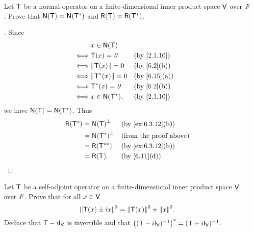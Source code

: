 \begin{ex}\label{ex:6.4.9}
	Let \(\mathsf{T}\) be a normal operator on a finite-dimensional inner product space \(\mathsf{V}\) over \(\mathit{F}\).
	Prove that \(\ns{\T} = \ns{\T^*}\) and \(\rg{\T} = \rg{\T^*}\).
\end{ex}

\begin{proof}[]
	Since
	\begin{align*}
		     & x \in \ns{\T}                        \\
		\iff & \T(x) = \zv        &  & \by{2.1.10}  \\
		\iff & \norm{\T(x)} = 0   &  & \by{6.2}[b]  \\
		\iff & \norm{\T^*(x)} = 0 &  & \by{6.15}[a] \\
		\iff & \T^*(x) = \zv      &  & \by{6.2}[b]  \\
		\iff & x \in \ns{\T^*},   &  & \by{2.1.10}
	\end{align*}
	we have \(\ns{\T} = \ns{\T^*}\).
	Thus
	\begin{align*}
		\rg{\T^*} & = \ns{\T}^{\perp}   &  & \by{ex:6.3.12}[b]             \\
		          & = \ns{\T^*}^{\perp} &  & \text{(from the proof above)} \\
		          & = \rg{\T^{**}}      &  & \by{ex:6.3.12}[b]             \\
		          & = \rg{\T}.          &  & \by{6.11}[d]
	\end{align*}
\end{proof}

\begin{ex}\label{ex:6.4.10}
	Let \(\mathsf{T}\) be a self-adjoint operator on a finite-dimensional inner product space \(\mathsf{V}\) over \(\mathit{F}\).
	Prove that for all \(x \in \mathsf{V}\)
	\[
		\norm{\T(x) \pm ix}^2 = \norm{\T(x)}^2 + \norm{x}^2.
	\]
	Deduce that \(\T - i \IT[\V]\) is invertible and that \(\pa{(\T - i \IT[\V])^{-1}}^* = (\T + i \IT[\V])^{-1}\).
\end{ex}

